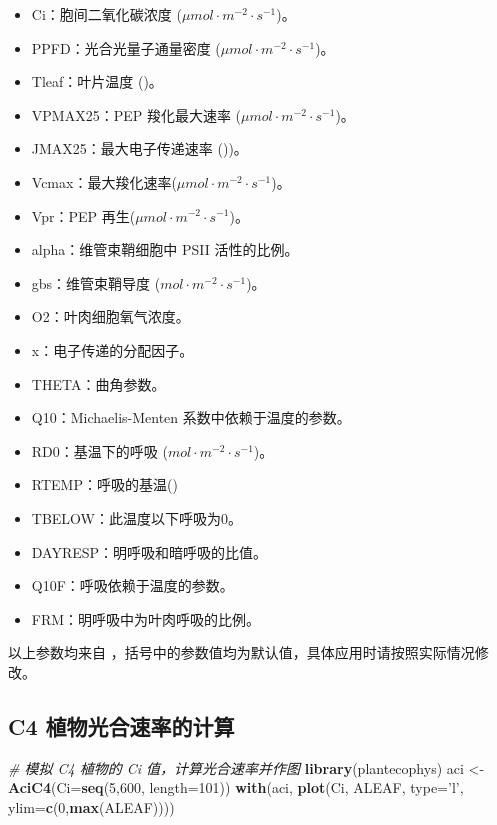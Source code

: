\documentclass[
]{krantz}
\makeatletter
\newenvironment{Shaded}{\begin{snugshade}}{\end{snugshade}}
\newcommand{\CommentTok}[1]{\textcolor[rgb]{0.56,0.35,0.01}{\textit{#1}}}
\newcommand{\DataTypeTok}[1]{\textcolor[rgb]{0.13,0.29,0.53}{#1}}
\newcommand{\DecValTok}[1]{\textcolor[rgb]{0.00,0.00,0.81}{#1}}
\newcommand{\KeywordTok}[1]{\textcolor[rgb]{0.13,0.29,0.53}{\textbf{#1}}}
\newcommand{\NormalTok}[1]{#1}
\newcommand{\StringTok}[1]{\textcolor[rgb]{0.31,0.60,0.02}{#1}}
\providecommand{\tightlist}{%
  \setlength{\itemsep}{0pt}\setlength{\parskip}{0pt}}
\newenvironment{kframe}{%
\medskip{}
\setlength{\fboxsep}{.8em}
 \def\at@end@of@kframe{}%
 \ifinner\ifhmode%
  \def\at@end@of@kframe{\end{minipage}}%
  \begin{minipage}{\columnwidth}%
 \fi\fi%
 \def\FrameCommand##1{\hskip\@totalleftmargin \hskip-\fboxsep
 \colorbox{shadecolor}{##1}\hskip-\fboxsep
     \hskip-\linewidth \hskip-\@totalleftmargin \hskip\columnwidth}%
 \MakeFramed {\advance\hsize-\width
   \@totalleftmargin\z@ \linewidth\hsize
   \@setminipage}}%
 {\par\unskip\endMakeFramed%
 \at@end@of@kframe}
\renewenvironment{Shaded}{\begin{kframe}}{\end{kframe}}
\makeatother
\begin{document}
\begin{itemize}
\tightlist
\item
  Ci：胞间二氧化碳浓度 (\(\mu mol\cdot m^{-2}\cdot s^{-1}\))。
\item
  PPFD：光合光量子通量密度 (\(\mu mol\cdot m^{-2}\cdot s^{-1}\))。
\item
  Tleaf：叶片温度 (\textcelsius)。
\item
  VPMAX25：PEP 羧化最大速率 (\(\mu mol\cdot m^{-2}\cdot s^{-1}\))。
\item
  JMAX25：最大电子传递速率 (\textcelsius))。
\item
  Vcmax：最大羧化速率(\(\mu mol\cdot m^{-2}\cdot s^{-1}\))。
\item
  Vpr：PEP 再生(\(\mu mol\cdot m^{-2}\cdot s^{-1}\))。
\item
  alpha：维管束鞘细胞中 PSII 活性的比例。
\item
  gbs：维管束鞘导度 (\(mol\cdot m^{-2}\cdot s^{-1}\))。
\item
  O2：叶肉细胞氧气浓度。
\item
  x：电子传递的分配因子。
\item
  THETA：曲角参数。
\item
  Q10：Michaelis-Menten 系数中依赖于温度的参数。
\item
  RD0：基温下的呼吸 (\(mol\cdot m^{-2}\cdot s^{-1}\))。
\item
  RTEMP：呼吸的基温(\textcelsius)
\item
  TBELOW：此温度以下呼吸为0。
\item
  DAYRESP：明呼吸和暗呼吸的比值。
\item
  Q10F：呼吸依赖于温度的参数。
\item
  FRM：明呼吸中为叶肉呼吸的比例。
\end{itemize}

以上参数均来自 \citet{Caemmerer2000Biochemical}，括号中的参数值均为默认值，具体应用时请按照实际情况修改。

\hypertarget{c4_sim}{%
\subsection{C4 植物光合速率的计算}\label{c4_sim}}

\begin{Shaded}
\begin{Highlighting}[]
\CommentTok{# 模拟 C4 植物的 Ci 值，计算光合速率并作图}
\KeywordTok{library}\NormalTok{(plantecophys)}
\NormalTok{aci <-}\StringTok{ }\KeywordTok{AciC4}\NormalTok{(}\DataTypeTok{Ci=}\KeywordTok{seq}\NormalTok{(}\DecValTok{5}\NormalTok{,}\DecValTok{600}\NormalTok{, }\DataTypeTok{length=}\DecValTok{101}\NormalTok{))}
\KeywordTok{with}\NormalTok{(aci, }\KeywordTok{plot}\NormalTok{(Ci, ALEAF, }\DataTypeTok{type=}\StringTok{'l'}\NormalTok{, }\DataTypeTok{ylim=}\KeywordTok{c}\NormalTok{(}\DecValTok{0}\NormalTok{,}\KeywordTok{max}\NormalTok{(ALEAF))))}
\end{Highlighting}
\end{Shaded}
\end{document}
